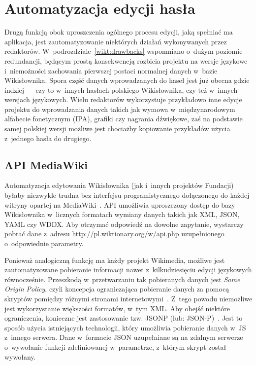 \section{Automatyzacja edycji hasła}
\label{sec:impl-auto}
Drugą funkcją obok uproszczenia ogólnego procesu edycji, jaką spełniać ma aplikacja, jest zautomatyzowanie niektórych działań wykonywanych przez redaktorów. W~podrozdziale~\ref{wikt:drawbacks} wspomniano o~dużym poziomie redundancji, będącym prostą konsekwencją rozbicia projektu na wersje językowe i~niemożności zachowania pierwszej postaci normalnej danych w~bazie Wikisłownika. Spora część danych wprowadzanych do haseł jest już obecna gdzie indziej --- czy to w~innych hasłach polskiego Wikisłownika, czy też w~innych wersjach językowych. Wielu redaktorów wykorzystuje przykładowo inne edycje projektu do wprowadzania danych takich jak wymowa w~międzynarodowym alfabecie fonetycznym (IPA), grafiki czy nagrania dźwiękowe, zaś na podstawie samej polskiej wersji możliwe jest chociażby kopiowanie przykładów użycia z~jednego hasła do drugiego.

\subsection{API MediaWiki}
Automatyzacja edytowania Wikisłownika (jak i~innych projektów Fundacji) byłaby niezwykle trudna bez interfejsu programistycznego dołączonego do każdej witryny opartej na MediaWiki~\cite{mw:api}. API umożliwia uproszczony dostęp do bazy Wikisłownika w~licznych formatach wymiany danych takich jak XML, JSON, YAML czy WDDX. Aby otrzymać odpowiedź na dowolne zapytanie, wystarczy pobrać dane z~adresu \url{http://pl.wiktionary.org/w/api.php} uzupełnionego o~odpowiednie parametry.

Ponieważ analogiczną funkcję ma każdy projekt Wikimedia, możliwe jest zautomatyzowane pobieranie informacji nawet z~kilkudziesięciu edycji językowych równocześnie. Przeszkodą w~przetwarzaniu tak pobieranych danych jest \emph{Same Origin Policy}, czyli koncepcja ograniczająca pobieranie danych za pomocą skryptów pomiędzy różnymi stronami internetowymi~\cite{mozilla:sop}. Z~tego powodu niemożliwe jest wykorzystanie większości formatów, w~tym XML. Aby obejść niektóre ograniczenia, konieczne jest zastosowanie tzw. JSONP (lub: \hbox{JSON-P})~\cite{jsonp}. Jest to sposób użycia istniejących technologii, który umożliwia pobieranie danych w~JS z~innego serwera. Dane w~formacie JSON uzupełniane są na zdalnym serwerze o~wywołanie funkcji zdefiniowanej w~parametrze, z~którym skrypt został wywołany.

